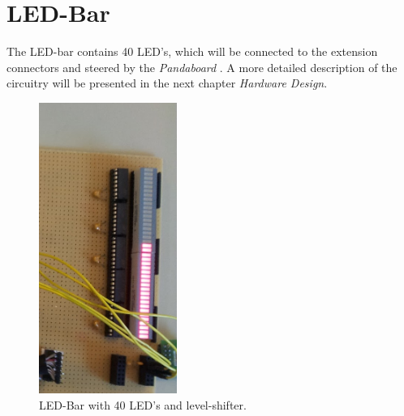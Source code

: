 \newpage
\section{LED-Bar}
The LED-bar contains 40 LED's, which will be connected to the extension connectors and steered by the \textit{Pandaboard} . A more detailed description of the  circuitry will be presented in the next chapter \textit{Hardware Design}. 
\begin{figure}[H]
   \centering
   \includegraphics[width=0.4\textwidth, angle=90]{img/LED-Bar.png}%
   \caption{LED-Bar with 40 LED's and level-shifter.}
   \label{fig:ledBar}%
\end{figure}

